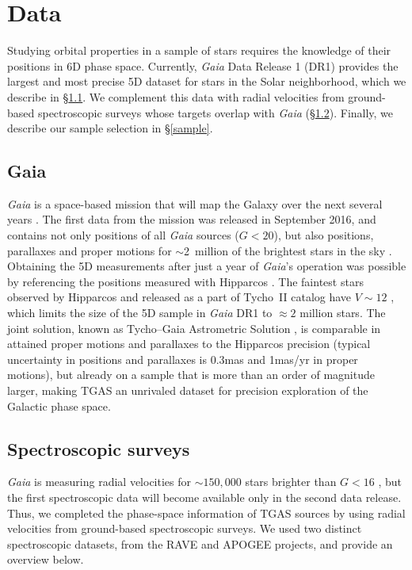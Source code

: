 \documentclass[apj, twocolappendix, numberedappendix, appendixfloats]{emulateapj}
\begin{document}
\section{Data}
\label{sec:data}
Studying orbital properties in a sample of stars requires the knowledge of their positions in 6D phase space.
Currently, \emph{Gaia} Data Release 1 (DR1) provides the largest and most precise 5D dataset for stars in the Solar neighborhood, which we describe in \S\ref{gaia}.
We complement this data with radial velocities from ground-based spectroscopic surveys whose targets overlap with \emph{Gaia} (\S\ref{rvsurveys}).
Finally, we describe our sample selection in \S\ref{sample}.

\subsection{Gaia}
\label{gaia}
\emph{Gaia} is a space-based mission that will map the Galaxy over the next several years \citep{perryman2001}.
The first data from the mission was released in September 2016, and contains not only positions of all \emph{Gaia} sources ($G<20$), but also positions, parallaxes and proper motions for $\sim$2~million of the brightest stars in the sky \citep{gaiadr1, gaiamission}.
Obtaining the 5D measurements after just a year of \emph{Gaia}'s operation was possible by referencing the positions measured with Hipparcos \citep{michalik2015}.
The faintest stars observed by Hipparcos \citep{hipparcos, vleeuwen2007} and released as a part of Tycho~II catalog have $V\sim12$ \citep{hog2000}, which limits the size of the 5D sample in \emph{Gaia} DR1 to $\approx2$ million stars.
The joint solution, known as Tycho--Gaia Astrometric Solution \citep[TGAS,][]{gaiaastrometry}, is comparable in attained proper motions and parallaxes to the Hipparcos precision (typical uncertainty in positions and parallaxes is 0.3\;mas and 1\;mas/yr in proper motions), but already on a sample that is more than an order of magnitude larger, making TGAS an unrivaled dataset for precision exploration of the Galactic phase space.

\subsection{Spectroscopic surveys}
\label{rvsurveys}
\emph{Gaia} is measuring radial velocities for $\sim150,000$ stars brighter than $G<16$ \citep{gaiamission}, but the first spectroscopic data will become available only in the second data release.
Thus, we completed the phase-space information of TGAS sources by using radial velocities from ground-based spectroscopic surveys.
We used two distinct spectroscopic datasets, from the RAVE and APOGEE projects, and provide an overview below.
\end{document}
